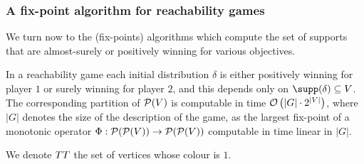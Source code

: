 \subsubsection{A fix-point algorithm for reachability games}

We turn now to the {\color{black} (fix-points)} algorithms which compute the set of supports that
are almost-surely or positively winning for various objectives.
\begin{theorem}
\label{theo:qdec1} 
In a reachability game each initial distribution $\delta$ is either positively winning for player $1$ or surely winning for player $2$, and this depends only on $\supp(\delta)\subseteq \states$.
  The corresponding partition of $\mathcal{P}(V)$ is computable in
  time $\mathcal{O}\left(|G| \cdot 2^{|V|}\right)$, where $|G| $ denotes
  the size of the description of the game,
  as the largest fix-point of a monotonic operator
$\Phi:\mathcal{P}(\mathcal{P}(V))\to \mathcal{P}(\mathcal{P}(V))$
computable in time linear in $|G| $.
\end{theorem}

We denote $TT$ the set of vertices whose colour is $1$.

